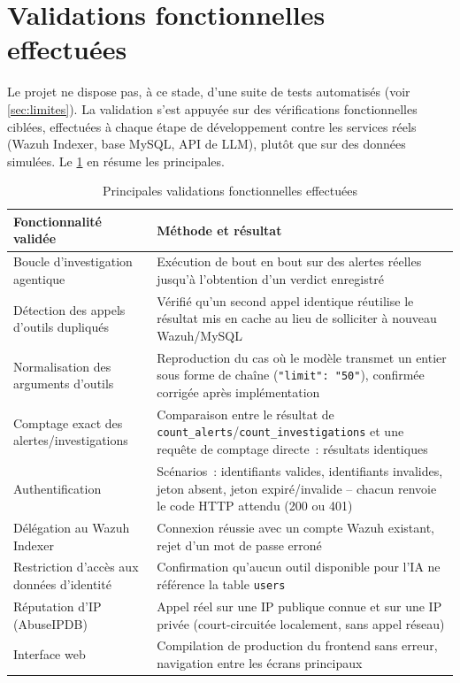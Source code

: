 \section{Validations fonctionnelles effectuées}

Le projet ne dispose pas, à ce stade, d'une suite de tests automatisés
(voir \cref{sec:limites}). La validation s'est appuyée sur des vérifications
fonctionnelles ciblées, effectuées à chaque étape de développement contre
les services réels (Wazuh Indexer, base MySQL, API de LLM), plutôt que sur
des données simulées. Le \cref{tab:validations} en résume les principales.

\begin{table}[H]
\centering
\caption{Principales validations fonctionnelles effectuées}
\label{tab:validations}
\begin{tabular}{@{}p{5cm}p{8cm}@{}}
\toprule
\textbf{Fonctionnalité validée} & \textbf{Méthode et résultat} \\
\midrule
Boucle d'investigation agentique & Exécution de bout en bout sur des
alertes réelles jusqu'à l'obtention d'un verdict enregistré \\
Détection des appels d'outils dupliqués & Vérifié qu'un second appel
identique réutilise le résultat mis en cache au lieu de solliciter à
nouveau Wazuh/MySQL \\
Normalisation des arguments d'outils & Reproduction du cas où le modèle
transmet un entier sous forme de chaîne (\texttt{"limit": "50"}), confirmée
corrigée après implémentation \\
Comptage exact des alertes/investigations & Comparaison entre le résultat
de \texttt{count\_alerts}/\texttt{count\_investigations} et une requête de
comptage directe~: résultats identiques \\
Authentification & Scénarios~: identifiants valides, identifiants
invalides, jeton absent, jeton expiré/invalide -- chacun renvoie le code
HTTP attendu (200 ou 401) \\
Délégation au Wazuh Indexer & Connexion réussie avec un compte Wazuh
existant, rejet d'un mot de passe erroné \\
Restriction d'accès aux données d'identité & Confirmation qu'aucun outil
disponible pour l'IA ne référence la table \texttt{users} \\
Réputation d'IP (AbuseIPDB) & Appel réel sur une IP publique connue et sur
une IP privée (court-circuitée localement, sans appel réseau) \\
Interface web & Compilation de production du frontend sans erreur,
navigation entre les écrans principaux \\
\bottomrule
\end{tabular}
\end{table}

